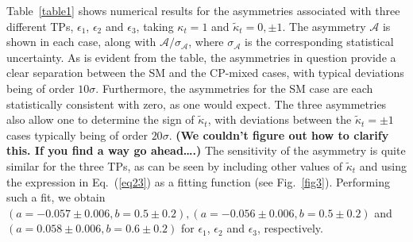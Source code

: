 \documentclass[aps,preprint,tightenlines,floatfix,superscriptaddress,nofootinbib,showpacs]{revtex4-1}
\def\kp{\kappa_t}
\def\kpt{\tilde{\kappa}_t}
\begin{document}
Table~\ref{table1} shows numerical results for the
asymmetries associated with three different TPs,
$\epsilon_1$, $\epsilon_2$ and $\epsilon_3$, taking
$\kp=1$ and $\kpt=0,\pm 1$.  The asymmetry $\mathcal{A}$
is shown in each case, along with $\mathcal{A}/\sigma_{\mathcal{A}}$, where
$\sigma_{\mathcal{A}}$ is the corresponding
statistical uncertainty.  As is
evident from the table, the asymmetries in question provide
a clear separation between the SM and the 
$\mathrm{CP}$-mixed cases, with typical deviations being of
order $10\sigma$.  Furthermore, the asymmetries
for the SM case are each statistically consistent with zero,
as one would expect.
The three asymmetries also allow one to
determine the sign of $\kpt$,
with deviations between the $\kpt = \pm 1$ cases typically
being of order $20\sigma$.
{\bf (We couldn't figure out how to clarify this. If you find a way go ahead\ldots.)}
The sensitivity of
the asymmetry is quite similar for the three TPs, as can be seen by
including other values of $\kpt$ and using the expression in
Eq.~(\ref{eq23}) as a fitting function (see Fig.~\ref{fig3}).
Performing such a fit, 
we obtain $(a=-0.057\pm 0.006, b=0.5\pm 0.2),
(a=-0.056\pm 0.006, b=0.5 \pm 0.2)$ and $(a=0.058\pm 0.006, b=0.6 \pm
0.2)$ for $\epsilon_1$, $\epsilon_2$ and $\epsilon_3$,
respectively.
\end{document}
